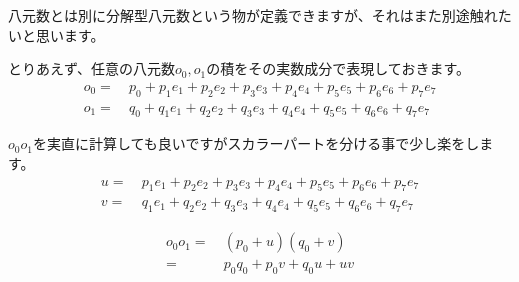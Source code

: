 \documentclass[a4paper,12pt,notitlepage]{jsreport}
\begin{document}
八元数とは別に分解型八元数という物が定義できますが、それはまた別途触れたいと思います。

とりあえず、任意の八元数$o_0,o_1$の積をその実数成分で表現しておきます。
\begin{equation}
\begin{split}
o_0=~&p_0+p_1e_1+p_2e_2+p_3e_3+p_4e_4+p_5e_5+p_6e_6+p_7e_7\\
o_1=~&q_0+q_1e_1+q_2e_2+q_3e_3+q_4e_4+q_5e_5+q_6e_6+q_7e_7
\end{split}
\end{equation}

$o_0o_1$を実直に計算しても良いですがスカラーパートを分ける事で少し楽をします。
\begin{equation}
\begin{split}
u=~&p_1e_1+p_2e_2+p_3e_3+p_4e_4+p_5e_5+p_6e_6+p_7e_7\\
v=~&q_1e_1+q_2e_2+q_3e_3+q_4e_4+q_5e_5+q_6e_6+q_7e_7
\end{split}
\end{equation}

\begin{equation}
\begin{split}
o_0o_1=~&(p_0+u)(q_0+v)\\
=~&p_0q_0+p_0v+q_0u+uv
\end{split}
\end{equation}
\end{document}
